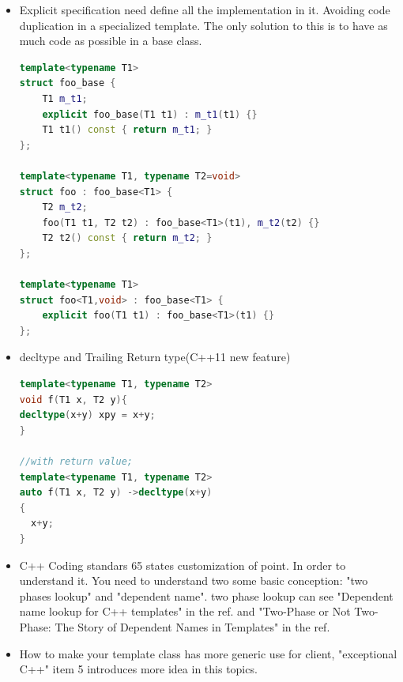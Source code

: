 \documentclass[a4paper,12pt,twoside]{book}
\begin{document}
\begin{itemize}
\item Explicit specification need define all the implementation in it. Avoiding code duplication in a specialized template. The only solution to this is to have as much code as possible in a base class.
\begin{lstlisting}[frame=single, language=c++]
template<typename T1>
struct foo_base {
    T1 m_t1;
    explicit foo_base(T1 t1) : m_t1(t1) {}
    T1 t1() const { return m_t1; }
};

template<typename T1, typename T2=void>
struct foo : foo_base<T1> {
    T2 m_t2;
    foo(T1 t1, T2 t2) : foo_base<T1>(t1), m_t2(t2) {}
    T2 t2() const { return m_t2; }
};

template<typename T1>
struct foo<T1,void> : foo_base<T1> {
    explicit foo(T1 t1) : foo_base<T1>(t1) {}
};
\end{lstlisting}

\item decltype and  Trailing Return type(C++11 new feature)
\begin{lstlisting}[frame=single, language=c++]
template<typename T1, typename T2>
void f(T1 x, T2 y){
decltype(x+y) xpy = x+y;
}

//with return value;
template<typename T1, typename T2>
auto f(T1 x, T2 y) ->decltype(x+y)
{
  x+y;
}
\end{lstlisting}


\item C++ Coding standars 65 states customization of point. In order to understand it. You need to understand two some basic conception: "two phases lookup" and "dependent name". two phase lookup can see "Dependent name lookup for C++ templates" in the ref.  and "Two-Phase or Not Two-Phase:
The Story of Dependent Names in Templates" in the ref.

\item How to make your template class has more generic use for client, "exceptional C++" item 5 introduces more idea in this topics.


\end{itemize}
\end{document}
